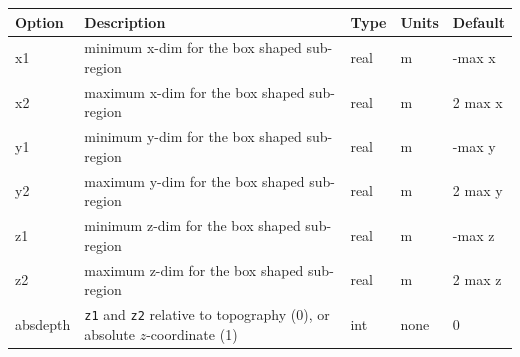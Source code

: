 \documentclass[11pt]{report}
\begin{document}
{\begin{center}
\begin{tabular}{|l|p{8cm}|l|l|l|}
		{\bf Option} & {\bf Description}                                                                & {\bf Type} & {\bf Units} & {\bf Default} \\ \hline
		\hline
		x1           & minimum x-dim for the box shaped sub-region                                      & real       & m           & -max x        \\ \hline
		x2           & maximum x-dim for the box shaped sub-region                                      & real       & m           & 2 max x       \\ \hline
		\hline
		y1           & minimum y-dim for the box shaped sub-region                                      & real       & m           & -max y        \\ \hline
		y2           & maximum y-dim for the box shaped sub-region                                      & real       & m           & 2 max y       \\ \hline
		\hline
		z1           & minimum z-dim for the box shaped sub-region                                      & real       & m           & -max z        \\ \hline
		z2           & maximum z-dim for the box shaped sub-region                                      & real       & m           & 2 max z       \\ \hline
		\hline
		absdepth     & {\tt z1} and {\tt z2} relative to topography (0), or absolute $z$-coordinate (1) & int
		             & none                                                                             & 0                                        \\ \hline
	\end{tabular}
\end{center}
%

}
\end{document}
